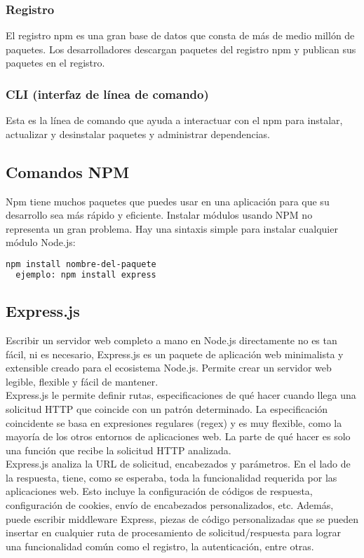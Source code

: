 \subsubsection{Registro}
El registro npm es una gran base de datos que consta de más de medio millón de paquetes. Los desarrolladores descargan paquetes del registro npm y publican sus paquetes en el registro.
\subsubsection{CLI (interfaz de línea de comando)}
Esta es la línea de comando que ayuda a interactuar con el npm para instalar, actualizar y desinstalar paquetes y administrar dependencias.
\subsection{Comandos NPM}
Npm tiene muchos paquetes que puedes usar en una aplicación para que su desarrollo sea más rápido y eficiente. Instalar módulos usando NPM no representa un gran problema. Hay una sintaxis simple para instalar cualquier módulo Node.js: \\[0.4cm]
\begin{lstlisting}[language=HTML]
  npm install nombre-del-paquete
  ejemplo: npm install express
\end{lstlisting}
% 
\subsection{Express.js}
Escribir un servidor web completo a mano en Node.js directamente no es tan fácil, ni es necesario, Express.js es un paquete de aplicación web minimalista y extensible creado para el ecosistema Node.js. Permite crear un servidor web legible, flexible y fácil de mantener. \\[0.8cm]
Express.js le permite definir rutas, especificaciones de qué hacer cuando llega una solicitud HTTP que coincide con un patrón determinado. La especificación coincidente se basa en expresiones regulares (regex) y es muy flexible, como la mayoría de los otros entornos de aplicaciones web. La parte de qué hacer es solo una función que recibe la solicitud HTTP analizada. \\[0.8cm]
Express.js analiza la URL de solicitud, encabezados y parámetros. En el lado de la respuesta, tiene, como se esperaba, toda la funcionalidad requerida por las aplicaciones web. Esto incluye la configuración de códigos de respuesta, configuración de cookies, envío de encabezados personalizados, etc. Además, puede escribir middleware Express, piezas de código personalizadas que se pueden insertar en cualquier ruta de procesamiento de solicitud/respuesta para lograr una funcionalidad común como el registro, la autenticación, entre otras. \\[0.8cm]

